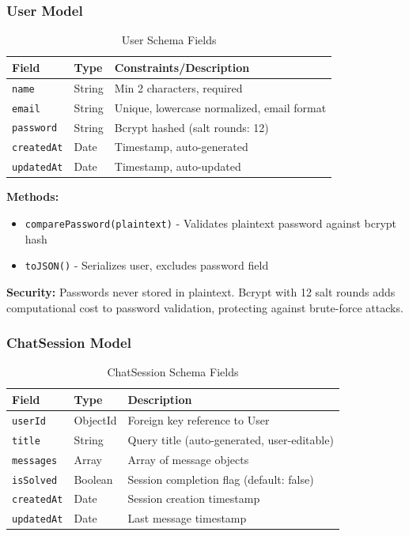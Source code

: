 \documentclass[12pt,a4paper]{article}
\begin{document}
\subsubsection{User Model}

\begin{table}[H]
\centering
\caption{User Schema Fields}
\label{tab:user_schema}
\begin{tabular}{|l|l|l|}
\hline
\textbf{Field} & \textbf{Type} & \textbf{Constraints/Description} \\
\hline
\texttt{name} & String & Min 2 characters, required \\
\hline
\texttt{email} & String & Unique, lowercase normalized, email format \\
\hline
\texttt{password} & String & Bcrypt hashed (salt rounds: 12) \\
\hline
\texttt{createdAt} & Date & Timestamp, auto-generated \\
\hline
\texttt{updatedAt} & Date & Timestamp, auto-updated \\
\hline
\end{tabular}
\end{table}

\textbf{Methods:}
\begin{itemize}
    \item \texttt{comparePassword(plaintext)} - Validates plaintext password against bcrypt hash
    \item \texttt{toJSON()} - Serializes user, excludes password field
\end{itemize}

\textbf{Security:} Passwords never stored in plaintext. Bcrypt with 12 salt rounds adds computational cost to password validation, protecting against brute-force attacks.

\subsubsection{ChatSession Model}

\begin{table}[H]
\centering
\caption{ChatSession Schema Fields}
\label{tab:chat_schema}
\begin{tabular}{|l|l|p{3.5cm}|}
\hline
\textbf{Field} & \textbf{Type} & \textbf{Description} \\
\hline
\texttt{userId} & ObjectId & Foreign key reference to User \\
\hline
\texttt{title} & String & Query title (auto-generated, user-editable) \\
\hline
\texttt{messages} & Array & Array of message objects \\
\hline
\texttt{isSolved} & Boolean & Session completion flag (default: false) \\
\hline
\texttt{createdAt} & Date & Session creation timestamp \\
\hline
\texttt{updatedAt} & Date & Last message timestamp \\
\hline
\end{tabular}
\end{table}
\end{document}
